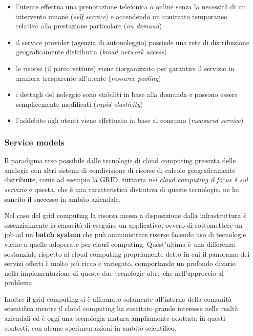 \begin{itemize}
\tightlist
\item
  l'utente effettua una prenotazione telefonica o online senza la
  necessità di un intervento umano (\emph{self service}) e accendendo un
  contratto temporaneo relativo alla prestazione particolare (\emph{on
  demand})
\item
  il service provider (agenzia di autonoleggio) possiede una rete di
  distribuzione geograficamente distribuita (\emph{broad network
  access})
\item
  le risorse (il parco vetture) viene riorganizzato per garantire il
  servizio in maniera trasparente all'utente (\emph{resource pooling})
\item
  i dettagli del noleggio sono stabiliti in base alla domanda e possono
  essere semplicemente modificati (\emph{rapid elasticity})
\item
  l'addebito agli utenti viene effettuato in base al consumo
  (\emph{measured service})
\end{itemize}

\subsubsection{Service models}\label{service-models}

Il paradigma reso possibile dalle tecnologie di cloud computing presenta
delle analogie con altri sistemi di condivisione di risorse di calcolo
geograficamente distribuite, come ad esempio la GRID, tuttavia \emph{nel
cloud computing il focus è sul servizio} e questa, che è una
caratteristica distintiva di queste tecnologie, ne ha sancito il
successo in ambito aziendale.

Nel caso del grid computing la risorsa messa a disposizione dalla
infrastruttura è essenzialmente la capacità di eseguire un applicativo,
ovvero di sottomettere un job ad un \textbf{batch system} che può
amministrare risorse facendo uso di tecnologie vicine a quelle adoperate
per cloud computing. Quest'ultima è una differenza sostanziale rispetto
al cloud computing propriamente detto in cui il panorama dei servizi
offerti è molto più ricco e variegato, comportando un profondo divario
nella implementazione di queste due tecnologie oltre che nell'approccio
al problema.

Inoltre il grid computing si è affermato solamente all'interno della
comunità scientifica mentre il cloud computing ha suscitato grande
interesse nelle realtà aziendali ed è oggi una tecnologia matura
ampliamente adottata in questi contesti, con alcune sperimentazioni in
ambito scientifico.

